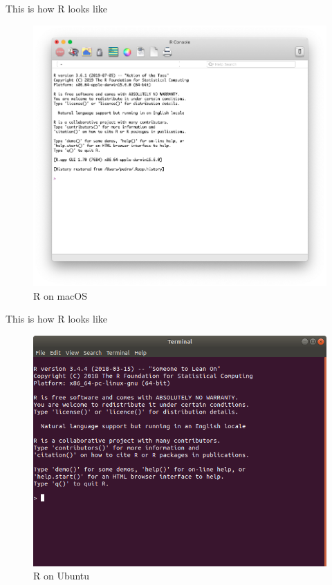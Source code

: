 \documentclass[ignorenonframetext,]{beamer}
\begin{document}
\begin{frame}{This is how R looks like}
\protect\hypertarget{this-is-how-r-looks-like-1}{}

\begin{figure}
\includegraphics[scale = .26]{figures/r-mac}
\caption{R on macOS}
\end{figure}

\end{frame}

\begin{frame}{This is how R looks like}
\protect\hypertarget{this-is-how-r-looks-like-2}{}

\begin{figure}
\includegraphics[scale = .3]{figures/r-linux}
\caption{R on Ubuntu}
\end{figure}

\end{frame}
\end{document}
